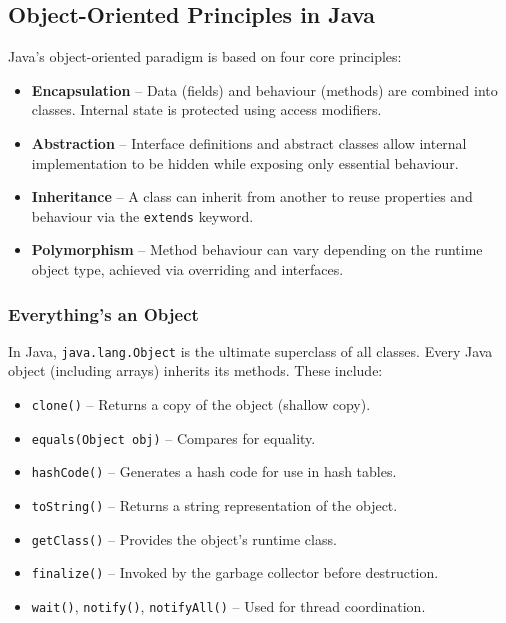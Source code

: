 \documentclass{article}
\newcommand{\codecmd}[1]{\textcolor[rgb]{0,0.5,0}{\texttt{#1}}}
\begin{document}
\subsection{Object-Oriented Principles in Java}

Java’s object-oriented paradigm is based on four core principles:

\begin{itemize}
    \item \textbf{Encapsulation} – Data (fields) and behaviour (methods) are combined into classes. Internal state is protected using access modifiers.
    \item \textbf{Abstraction} – Interface definitions and abstract classes allow internal implementation to be hidden while exposing only essential behaviour.
    \item \textbf{Inheritance} – A class can inherit from another to reuse properties and behaviour via the \texttt{extends} keyword.
    \item \textbf{Polymorphism} – Method behaviour can vary depending on the runtime object type, achieved via overriding and interfaces.
\end{itemize}

\subsubsection{Everything's an Object}

In Java, \codecmd{java.lang.Object} is the ultimate superclass of all classes. Every Java object (including arrays) inherits its methods. These include:

\begin{itemize}
    \item \codecmd{clone()} – Returns a copy of the object (shallow copy).
    \item \codecmd{equals(Object obj)} – Compares for equality.
    \item \codecmd{hashCode()} – Generates a hash code for use in hash tables.
    \item \codecmd{toString()} – Returns a string representation of the object.
    \item \codecmd{getClass()} – Provides the object's runtime class.
    \item \codecmd{finalize()} – Invoked by the garbage collector before destruction.
    \item \codecmd{wait()}, \codecmd{notify()}, \codecmd{notifyAll()} – Used for thread coordination.
\end{itemize}
\end{document}
